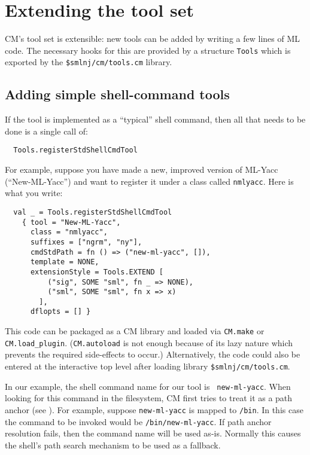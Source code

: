 %

\chapter{Extending the tool set}
\label{chap:moretools}

CM's tool set is extensible: new tools can be added by writing a few
lines of ML code.  The necessary hooks for this are provided by a
structure {\tt Tools} which is exported by the {\tt \$smlnj/cm/tools.cm}
library.

\section{Adding simple shell-command tools}
\label{sec:addshellclass}

If the tool is implemented as a ``typical'' shell command, then all
that needs to be done is a single call of:

\begin{lstlisting}
  Tools.registerStdShellCmdTool
\end{lstlisting}%

For example, suppose you have made a
new, improved version of ML-Yacc (``New-ML-Yacc'') and want to
register it under a class called {\tt nmlyacc}.  Here is what you
write:

\begin{lstlisting}
  val _ = Tools.registerStdShellCmdTool
    { tool = "New-ML-Yacc",
      class = "nmlyacc",
      suffixes = ["ngrm", "ny"],
      cmdStdPath = fn () => ("new-ml-yacc", []),
      template = NONE,
      extensionStyle = Tools.EXTEND [
          ("sig", SOME "sml", fn _ => NONE),
          ("sml", SOME "sml", fn x => x)
        ],
      dflopts = [] }
\end{lstlisting}%

This code can be packaged as a CM library and loaded via {\tt CM.make}
or {\tt CM.load\_plugin}.  ({\tt CM.autoload} is not enough because of
its lazy nature which prevents the required side-effects to occur.)
Alternatively, the code could also be entered at the interactive top
level after loading library {\tt \$smlnj/cm/tools.cm}.

In our example, the shell command name for our tool is {\tt
new-ml-yacc}.  When looking for this command in the filesystem, CM
first tries to treat it as a path anchor (see
).  For example, suppose {\tt new-ml-yacc} is
mapped to {\tt /bin}.  In this case the command to be
invoked would be {\tt /bin/new-ml-yacc}.  If path anchor resolution
fails, then the command name will be used as-is.  Normally this
causes the shell's path search mechanism to be used as a fallback.

